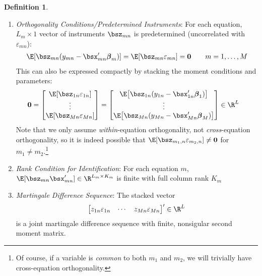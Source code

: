 \documentclass[12pt]{article}
\theoremstyle{plain}
\theoremstyle{definition}
\newtheorem{defn}[thm]{Definition}
\theoremstyle{remark}
\newcommand{\bsbeta}{\boldsymbol{\beta}}
\renewcommand{\bso}{\boldsymbol{0}}
\begin{document}
\begin{defn}
\begin{enumerate}
  \item \emph{Orthogonality Conditions/Predetermined Instruments}:
    For each equation, $L_m\times 1$ vector of instruments $\bsz_{mn}$
    is predetermined (uncorrelated with $\varepsilon_{mn}$):
    \begin{align*}
      \E[\bsz_{mn} (y_{mn} - \bsx'_{mn} \bsbeta_m)]
        =\E[\bsz_{mn}\varepsilon_{mn}]= \bso
      \qquad m = 1,\ldots,M
    \end{align*}
    This can also be expressed compactly by stacking the moment
    conditions and parameters:
    \begin{align}
      \bso &=
      \begin{bmatrix}
        \E[\bsz_{1n}\varepsilon_{1n}] \\
        \vdots\\
        \E[\bsz_{Mn}\varepsilon_{Mn}] \\
      \end{bmatrix}
      =
      \begin{bmatrix}
        \E\big[\bsz_{1n}(y_{1n}-\bsx_{1n}'\bsbeta_1)\big] \\
        \vdots\\
        \E\big[\bsz_{Mn}(y_{Mn}-\bsx_{Mn}'\bsbeta_M)\big] \\
      \end{bmatrix}
      \in \R^{L}
      \label{multipleortho}
    \end{align}
    Note that we only assume \emph{within}-equation orthogonality, not
    \emph{cross}-equation orthogonality, so it is indeed possible that
    $\E[\bsz_{m_1,n}\varepsilon_{m_2,n}]\neq\bso$ for
    $m_1\neq m_2$.\footnote{%
      Of course, if a variable is \emph{common} to both $m_1$ and $m_2$,
      we will trivially have cross-equation orthogonality.
    }

  \item \emph{Rank Condition for Identification}:
    For each equation $m$,
    $\E[\bsz_{mn}\bsx_{mn}']\in\R^{L_m \times K_m}$ is finite with full
    column rank $K_m$

  \item \emph{Martingale Difference Sequence}:
    The stacked vector
    \begin{align*}
      \begin{bmatrix}
        z_{1n}\varepsilon_{1n} & \cdots &
        z_{Mn}\varepsilon_{Mn}
      \end{bmatrix}'
        \in \R^L
    \end{align*}
    is a joint martingale difference sequence with finite, nonsigular
    second moment matrix.
\end{enumerate}
\end{defn}
\end{document}
